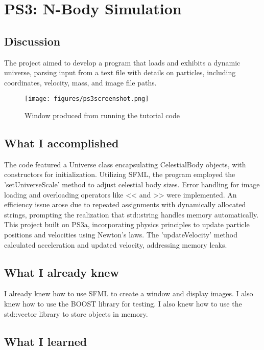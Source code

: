 \section{PS3: N-Body Simulation}\label{sec:ps3}

\subsection{Discussion}\label{sec:ps3:disc}

The project aimed to develop a program that loads and exhibits a dynamic universe, parsing input from a text file with details on particles, including coordinates, velocity, mass, and image file paths.

\begin{figure}[tbh]
	\centering
	\texttt{[image: figures/ps3screenshot.png]}
	\caption{Window produced from running the tutorial code}\label{fig:ps3ss}
\end{figure}


\subsection{What I accomplished}\label{sec:ps3:accomplish}

The code featured a Universe class encapsulating CelestialBody objects, with constructors for initialization. Utilizing SFML, the program employed the 'setUniverseScale' method to adjust celestial body sizes. Error handling for image loading and overloading operators like << and >> were implemented. An efficiency issue arose due to repeated assignments with dynamically allocated strings, prompting the realization that std::string handles memory automatically. This project built on PS3a, incorporating physics principles to update particle positions and velocities using Newton's laws. The 'updateVelocity' method calculated acceleration and updated velocity, addressing memory leaks.

\subsection{What I already knew}\label{sec:ps3:knew}

I already knew how to use SFML to create a window and display images. I also knew how to use the BOOST library for testing. I also knew how to use the std::vector library to store objects in memory.

\subsection{What I learned}\label{sec:ps3:learned}

